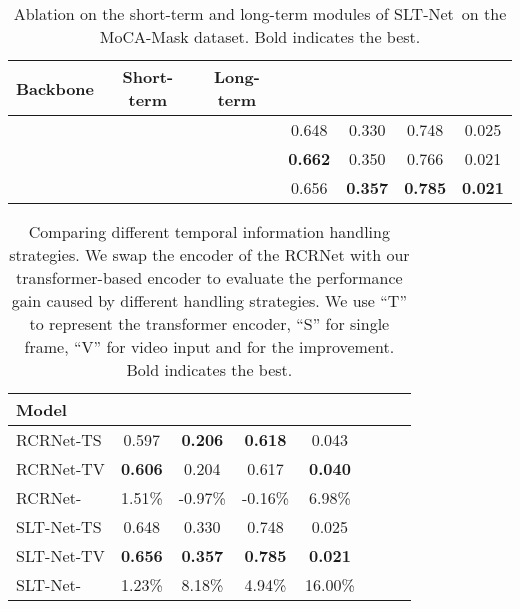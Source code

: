 \documentclass[10pt,twocolumn,letterpaper]{article}
\def\Ourmodel{SLT-Net}
\begin{document}
\begin{table}[t!]
    \footnotesize
    \centering
    \caption{Ablation on the short-term and long-term modules of \Ourmodel~on the MoCA-Mask dataset. Bold indicates the best.}
    \label{tab:ab_short_long}
    \vspace{-5pt}
    \tabcolsep=0.14cm
    \renewcommand{\arraystretch}{0.5}
    \begin{tabular}{ccc|cccc}
    \toprule
     Backbone & Short-term & Long-term &  &  & & \\ 
     \midrule 
      & & & {0.648} &  {0.330}  & {0.748}  &  {0.025}  \\
      &  & &  \textbf{0.662} & 0.350  & 0.766  & 0.021  \\
      &  &  & 0.656 & \textbf{0.357} & \textbf{0.785} & \textbf{0.021} \\
     
    \bottomrule
    \end{tabular}
\end{table}

\begin{table}[t!]
    \footnotesize
    \centering
    \caption{Comparing different temporal information handling strategies. We swap the encoder of the RCRNet \cite{yan2019semi} with our transformer-based encoder to evaluate the performance gain caused by different handling strategies. We use ``T'' to represent the transformer encoder, ``S'' for single frame, ``V'' for video input and  for the improvement. Bold indicates the best.}\label{tab:RCRnet}
    \vspace{-5pt}
    \tabcolsep=0.34cm
    \renewcommand{\arraystretch}{0.5}
    \begin{tabular}{l|ccccccc}
    \toprule
Model &  &  & & \\ 
     \midrule 
     RCRNet-TS & 0.597 & \textbf{0.206} & \textbf{0.618} & 0.043 \\
     RCRNet-TV & \textbf{0.606} & 0.204 & 0.617 & \textbf{0.040} \\
     \hline
      RCRNet-  & 1.51\% &-0.97\% &-0.16\% &6.98\% \\
     \midrule
     \Ourmodel-TS & {0.648} &  {0.330}  & {0.748}  &  {0.025}  \\
     \Ourmodel-TV & \textbf{0.656}& \textbf{0.357} & \textbf{0.785} & \textbf{0.021} \\
     \hline
     \Ourmodel- & 1.23\% & 8.18\% & 4.94\% & 16.00\% \\
    \bottomrule
    \end{tabular}
    \vspace{-5pt}
\end{table}
\end{document}

